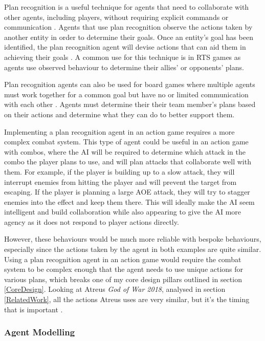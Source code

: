 \documentclass{IEEEtran}
\begin{document}
Plan recognition is a useful technique for agents that need to collaborate with other agents, including players, without requiring explicit commands or communication \cite{GeneratingCollabBehaviourPlanRecognition2016, PandemicPlanRecognition2021}. Agents that use plan recognition observe the actions taken by another entity in order to determine their goals. Once an entity’s goal has been identified, the plan recognition agent will devise actions that can aid them in achieving their goals \cite{GeneratingCollabBehaviourPlanRecognition2016}. A common use for this technique is in RTS games \cite{PlayerAdaptiveRTSAI2007} as agents use observed behaviour to determine their allies' or opponents' plans.

Plan recognition agents can also be used for board games where multiple agents must work together for a common goal but have no or limited communication with each other \cite{PandemicPlanRecognition2021}. Agents must determine their their team member's plans based on their actions and determine what they can do to better support them.

Implementing a plan recognition agent in an action game requires a more complex combat system. This type of agent could be useful in an action game with combos, where the AI will be required to determine which attack in the combo the player plans to use, and will plan attacks that collaborate well with them. For example, if the player is building up to a slow attack, they will interrupt enemies from hitting the player and will prevent the target from escaping. If the player is planning a large AOE attack, they will try to stagger enemies into the effect and keep them there. This will ideally make the AI seem intelligent and build collaboration while also appearing to give the AI more agency as it does not respond to player actions directly.

However, these behaviours would be much more reliable with bespoke behaviours, especially since the actions taken by the agent in both examples are quite similar. Using a plan recognition agent in an action game would require the combat system to be complex enough that the agent needs to use unique actions for various plans, which breaks one of my core design pillars outlined in section \ref{CoreDesign}. Looking at Atreus \textit{God of War 2018}, analysed in section \ref{RelatedWork}, all the actions Atreus uses are very similar, but it’s the timing that is important \cite{GDCAtreus}.

\subsubsection{Agent Modelling}
\label{AgentModelling}
\end{document}
